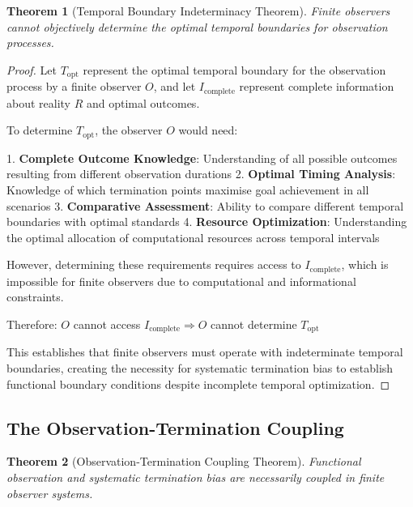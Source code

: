 \documentclass[12pt,a4paper]{article}
\newtheorem{theorem}{Theorem}[section]
\begin{document}
\begin{theorem}[Temporal Boundary Indeterminacy Theorem]
Finite observers cannot objectively determine the optimal temporal boundaries for observation processes.
\end{theorem}

\begin{proof}
Let $T_{\text{opt}}$ represent the optimal temporal boundary for the observation process by a finite observer $O$, and let $I_{\text{complete}}$ represent complete information about reality $R$ and optimal outcomes.

To determine $T_{\text{opt}}$, the observer $O$ would need:

1. \textbf{Complete Outcome Knowledge}: Understanding of all possible outcomes resulting from different observation durations
2. \textbf{Optimal Timing Analysis}: Knowledge of which termination points maximise goal achievement in all scenarios
3. \textbf{Comparative Assessment}: Ability to compare different temporal boundaries with optimal standards
4. \textbf{Resource Optimization}: Understanding the optimal allocation of computational resources across temporal intervals

However, determining these requirements requires access to $I_{\text{complete}}$, which is impossible for finite observers due to computational and informational constraints.

Therefore: $O$ cannot access $I_{\text{complete}} \Rightarrow O$ cannot determine $T_{\text{opt}}$

This establishes that finite observers must operate with indeterminate temporal boundaries, creating the necessity for systematic termination bias to establish functional boundary conditions despite incomplete temporal optimization.
\end{proof}

\subsection{The Observation-Termination Coupling}

\begin{theorem}[Observation-Termination Coupling Theorem]
Functional observation and systematic termination bias are necessarily coupled in finite observer systems.
\end{theorem}
\end{document}
